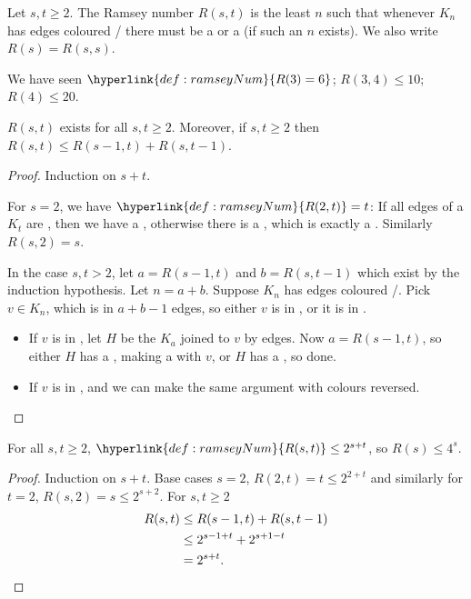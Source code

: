 \documentclass{article}
\begin{document}
\begin{defi}
    Let $s, t \geq 2$. The Ramsey number $R(s, t)$ is the least $n$ such that whenever \hyperlink{def:Kn}{$K_n$} has edges coloured / there must be a  or a  (if such an $n$ exists).
    We also write $R(s) = R(s, s)$.
\end{defi}

We have seen $\hyperlink{def:ramseyNum}{R(3) = 6}$; $R(3, 4) \leq 10$; $R(4) \leq 20$.

\begin{nthm}\label{thm:ramsey}
    \hyperlink{def:ramseyNum}{$R(s, t)$} exists for all $s, t \geq 2$.
    Moreover, if $s, t \geq 2$ then $R(s, t) \leq R(s-1, t) + R(s, t-1)$.
\end{nthm}

\begin{proof}
    Induction on $s+t$.

    For $s=2$, we have $\hyperlink{def:ramseyNum}{R(2, t)} = t$: If all edges of a $K_t$ are , then we have a , otherwise there is a , which is exactly a .  Similarly $R(s, 2) = s$.

    In the case $s, t > 2$, let $a = R(s-1, t)$ and $b = R(s, t-1)$ which exist by the induction hypothesis.  Let $n = a+b$. Suppose $K_n$ has edges coloured /.
    Pick $v \in K_n$, which is in $a+b-1$ edges, so either $v$ is in , or it is in .
    \begin{itemize}
        \item If $v$ is in , let $H$ be the $K_a$ joined to $v$ by  edges.  Now $a = R(s-1, t)$, so either $H$ has a , making a  with $v$, or $H$ has a , so done.
        \item If $v$ is in , and we can make the same argument with colours reversed.
    \end{itemize}
\end{proof}

\begin{ncor}\label{cor:3}
    For all $s, t \geq 2$, $\hyperlink{def:ramseyNum}{R(s, t)} \leq 2^{s+t}$, so $R(s) \leq 4^s$.
\end{ncor}

\begin{proof}
    Induction on $s + t$.  Base cases $s=2$, $R(2, t) = t \leq 2^{2+t}$ and similarly for $t=2$, $R(s, 2) = s \leq 2^{s+2}$.
    For $s, t \geq 2$
    \begin{align*}
        R(s, t) &\leq R(s-1, t) + R(s, t-1) \\
                &\leq 2^{s-1+t} + 2^{s+1-t} \\
                &= 2^{s+t}. \qedhere
    \end{align*}
\end{proof}
\end{document}
